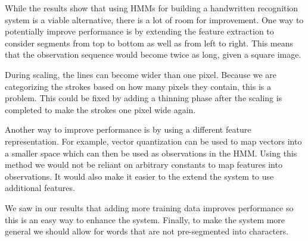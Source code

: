 

While the results show that using HMMs for building a handwritten recognition system is a viable alternative, there is a lot of room for improvement.
One way to potentially improve performance is by extending the feature extraction to consider segments from top to bottom as well as from left to right.
This means that the observation sequence would become twice as long, given a square image.

During scaling, the lines can become wider than one pixel.
Because we are categorizing the strokes based on how many pixels they contain, this is a problem.
This could be fixed by adding a thinning phase after the scaling is completed to make the strokes one pixel wide again.

Another way to improve performance is by using a different feature representation.
For example, vector quantization can be used to map vectors into a smaller space which can then be used as observations in the HMM.
Using this method we would not be reliant on arbitrary constants to map features into observations.
It would also make it easier to the extend the system to use additional features.

We saw in our results that adding more training data improves performance so this is an easy way to enhance the system.
Finally, to make the system more general we should allow for words that are not pre-segmented into characters.